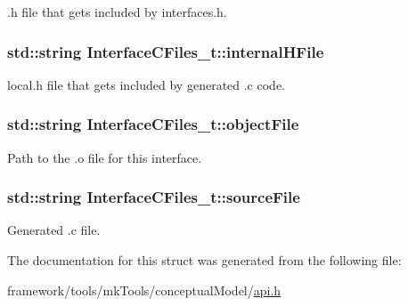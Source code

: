 .h file that gets included by interfaces.\+h. 

\subsubsection[{\texorpdfstring{internal\+H\+File}{internalHFile}}]{\setlength{\rightskip}{0pt plus 5cm}std\+::string Interface\+C\+Files\+\_\+t\+::internal\+H\+File}\hypertarget{struct_interface_c_files__t_aa9ff4555c773489e312e18c79e37dfb7}{}\label{struct_interface_c_files__t_aa9ff4555c773489e312e18c79e37dfb7}


local.\+h file that gets included by generated .c code. 

\subsubsection[{\texorpdfstring{object\+File}{objectFile}}]{\setlength{\rightskip}{0pt plus 5cm}std\+::string Interface\+C\+Files\+\_\+t\+::object\+File}\hypertarget{struct_interface_c_files__t_a756a3d709f1e3e05c7132ce74942833d}{}\label{struct_interface_c_files__t_a756a3d709f1e3e05c7132ce74942833d}


Path to the .o file for this interface. 

\subsubsection[{\texorpdfstring{source\+File}{sourceFile}}]{\setlength{\rightskip}{0pt plus 5cm}std\+::string Interface\+C\+Files\+\_\+t\+::source\+File}\hypertarget{struct_interface_c_files__t_a50101efc16784932c133f9eda53da285}{}\label{struct_interface_c_files__t_a50101efc16784932c133f9eda53da285}


Generated .c file. 



The documentation for this struct was generated from the following file\+:\begin{DoxyCompactItemize}
\item 
framework/tools/mk\+Tools/conceptual\+Model/\hyperlink{api_8h}{api.\+h}\end{DoxyCompactItemize}
